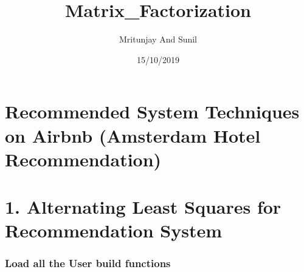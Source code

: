 \documentclass[]{article}
\title{Matrix\_Factorization}
\author{Mritunjay And Sunil}
\date{15/10/2019}
\begin{document}
\maketitle

\hypertarget{recommended-system-techniques-on-airbnb-amsterdam-hotel-recommendation}{%
\section{Recommended System Techniques on Airbnb (Amsterdam Hotel
Recommendation)}\label{recommended-system-techniques-on-airbnb-amsterdam-hotel-recommendation}}

\hypertarget{alternating-least-squares-for-recommendation-system}{%
\section{1. Alternating Least Squares for Recommendation
System}\label{alternating-least-squares-for-recommendation-system}}

\hypertarget{load-all-the-user-build-functions}{%
\subsubsection{Load all the User build
functions}\label{load-all-the-user-build-functions}}
\end{document}
